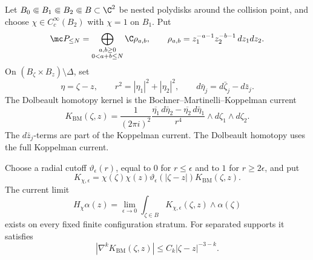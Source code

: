\begin{thm}
\label{thm:app-finite-window-bmk-current-transfer}
\label{thm:app-bmk-current-obstruction-data}
  Let
  \(B_0\Subset B_1\Subset B_2\Subset B\subset\C^2\) be nested
  polydisks around the collision point, and choose
  \(\chi\in C_c^\infty(B_2)\) with \(\chi=1\) on \(B_1\).  Put
  \[
    \mc P_{\leq N}
      =
      \bigoplus_{\substack{a,b\geq0\\0<a+b\leq N}}\C\rho_{a,b},
      \qquad
    \rho_{a,b}=z_1^{-a-1}z_2^{-b-1}\,dz_1dz_2 .
  \]
  On \((B_\zeta\times B_z)\setminus\Delta\), set
  \[
    \eta=\zeta-z,\qquad
    r^2=|\eta_1|^2+|\eta_2|^2,\qquad
    d\bar\eta_j=d\bar\zeta_j-d\bar z_j .
  \]
  The Dolbeault homotopy kernel is the
  Bochner--Martinelli--Koppelman current
  \[
    K_{\mathrm{BM}}(\zeta,z)
    =
    \frac{1}{(2\pi i)^2}
    \frac{
      \overline{\eta_1}\,d\bar\eta_2
      -
      \overline{\eta_2}\,d\bar\eta_1
    }{r^4}
    \wedge d\zeta_1\wedge d\zeta_2 .
  \]
  The \(d\bar z_j\)-terms are part of the Koppelman current.  The
  Dolbeault homotopy uses the full Koppelman current.

  Choose a radial cutoff \(\vartheta_\epsilon(r)\), equal to \(0\) for
  \(r\leq\epsilon\) and to \(1\) for \(r\geq2\epsilon\), and put
  \[
    K_{\chi,\epsilon}
      =
      \chi(\zeta)\chi(z)\vartheta_\epsilon(|\zeta-z|)
      K_{\mathrm{BM}}(\zeta,z).
  \]
  The current limit
  \[
    H_\chi\alpha(z)
      =
      \lim_{\epsilon\to0}
      \int_{\zeta\in B}K_{\chi,\epsilon}(\zeta,z)\wedge\alpha(\zeta)
  \]
  exists on every fixed finite configuration stratum.  For separated
  supports it satisfies
  \[
    |\nabla^kK_{\mathrm{BM}}(\zeta,z)|
      \leq C_k|\zeta-z|^{-3-k}.
  \]


\end{thm}
